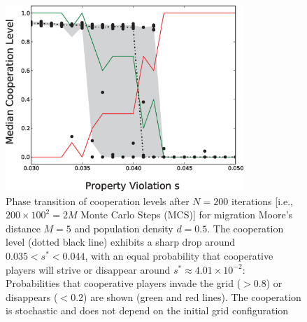 \begin{figure}[h]
\begin{center}
\centerline{\includegraphics[width=9cm]{../figures2/phase_transition_d05_paper.eps}}
\caption{Phase transition of cooperation levels after $N=200$ iterations [i.e., $200 \times 100^2 = 2M$ Monte Carlo Steps (MCS)] for migration Moore's distance $M = 5$ and population density $d=0.5$. The cooperation level (dotted black line) exhibits a sharp drop around $0.035 < s^{*} < 0.044$, with an equal probability that cooperative players will strive or disappear around $s^{*} \approx 4.01\times10^{-2}$: Probabilities that cooperative players invade the grid ($> 0.8$) or disappears ($< 0.2$) are shown (green and red lines). The cooperation is stochastic and does not depend on the initial grid configuration}
\label{fig:comparison_no_with_migration}
\end{center}
\end{figure}




